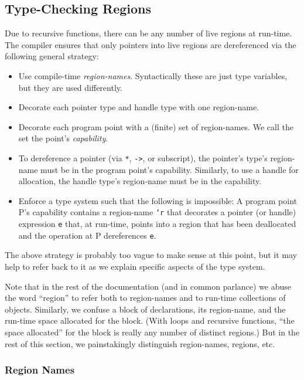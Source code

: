 \subsection{Type-Checking Regions}

Due to recursive functions, there can be any number of live regions at
run-time.  The compiler ensures that only pointers into live regions
are dereferenced via the following general strategy:

\begin{itemize}
\item Use compile-time \emph{region-names}.  Syntactically these are
  just type variables, but they are used differently.
\item Decorate each pointer type and handle type with one region-name. 
\item Decorate each program point with a (finite) set of region-names.
  We call the set the point's \emph{capability}.
\item To dereference a pointer (via \texttt{*}, \texttt{->}, or
  subscript), the pointer's type's region-name must be in the program
  point's capability.  Similarly, to use a handle for allocation, the
  handle type's region-name must be in the capability.
\item Enforce a type system such that the following is impossible: A
  program point P's capability contains a region-name \texttt{`r} that
  decorates a pointer (or handle) expression \texttt{e} that, at
  run-time, points into a region that has been deallocated and the
  operation at P dereferences \texttt{e}.
\end{itemize}

The above strategy is probably too vague to make sense at this point,
but it may help to refer back to it as we explain specific aspects of
the type system.

Note that in the rest of the documentation (and in common parlance) we
abuse the word ``region'' to refer both to region-names and to
run-time collections of objects.  Similarly, we confuse a block of
declarations, its region-name, and the run-time space allocated for
the block.  (With loops and recursive functions, ``the space
allocated'' for the block is really any number of distinct regions.)
But in the rest of this section, we painstakingly distinguish
region-names, regions, etc.

\subsubsection{Region Names}

